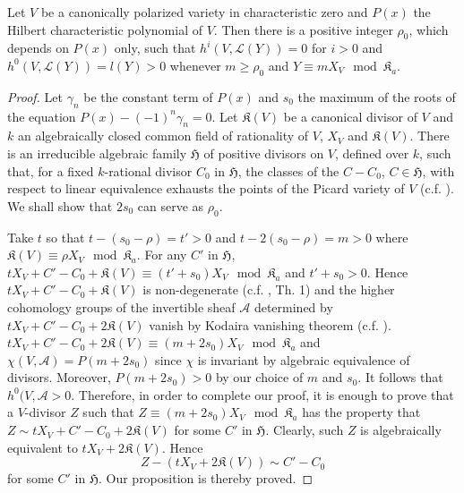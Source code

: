 \begin{proposition}\label{art14-peop1}
Let $V$ be a canonically polarized variety in characteristic zero and $P(x)$ the Hilbert characteristic polynomial of $V$. Then there is a positive integer $\rho_{0}$, which depends on $P(x)$ only, such that $h^{i}(V,\mathscr{L}(Y))=0$ for $i>0$ and $h^{0}(V,\mathscr{L}(Y))=l(Y)>0$ whenever $m\geq \rho_{0}$ and $Y\equiv mX_{V}\mod \mathfrak{K}_{a}$.
\end{proposition}

\begin{proof}
Let $\gamma_{n}$ be the constant term of $P(x)$ and $s_{0}$ the maximum of the roots of the equation $P(x)-(-1)^{n}\gamma_{n}=0$. Let $\mathfrak{K}(V)$ be a canonical divisor of $V$ and $k$ an algebraically closed common field of rationality of $V$, $X_{V}$ and $\mathfrak{K}(V)$. There is an irreducible algebraic family $\mathfrak{H}$ of positive divisors on $V$, defined over $k$, such that, for a fixed $k$-rational divisor $C_{0}$ in $\mathfrak{H}$, the classes of the $C-C_{0}$, $C\in \mathfrak{H}$, with respect to linear equivalence exhausts the points of the Picard variety of $V$ (c.f. \cite{art14-key15}). We shall show that $2s_{0}$ can serve as $\rho_{0}$.

Take $t$ so that $t-(s_{0}-\rho)=t'>0$ and $t-2(s_{0}-\rho)=m>0$ where $\mathfrak{K}(V)\equiv \rho X_{V}\mod \mathfrak{K}_{a}$. For any $C'$ in $\mathfrak{H}$, $tX_{V}+C'-C_{0}+\mathfrak{K}(V)\equiv (t'+s_{0})X_{V}\mod \mathfrak{K}_{a}$ and $t'+s_{0}>0$. Hence $tX_{V}+C'-C_{0}+\mathfrak{K}(V)$ is non-degenerate (c.f. \cite{art14-key16}, Th. 1) and the higher cohomology groups of the invertible sheaf $\mathscr{A}$ determined by $tX_{V}+C'-C_{0}+2\mathfrak{K}(V)$ vanish by Kodaira vanishing theorem (c.f. \cite{art14-key11}). $tX_{V}+C'-C_{0}+2\mathfrak{K}(V)\equiv (m+2s_{0})X_{V}\mod \mathfrak{K}_{a}$ and $\chi(V,\mathscr{A})=P(m+2s_{0})$ since $\chi$ is invariant by algebraic equivalence of divisors. Moreover, $P(m+2s_{0})>0$ by our choice of $m$ and $s_{0}$. It follows that $h^{0}(V,\mathscr{A}>0$. Therefore, in order to complete our proof, it is enough to prove that a $V$-divisor $Z$ such that $Z\equiv (m+2s_{0})X_{V}\mod \mathfrak{K}_{a}$ has the property that $Z\sim tX_{V}+C'-C_{0}+2\mathfrak{K}(V)$ for some $C'$ in $\mathfrak{H}$. Clearly, such $Z$ is algebraically equivalent to $tX_{V}+2\mathfrak{K}(V)$. Hence
$$
Z-(tX_{V}+2\mathfrak{K}(V))\sim C'-C_{0}
$$
for some $C'$ in $\mathfrak{H}$. Our proposition is thereby proved.
\end{proof}

